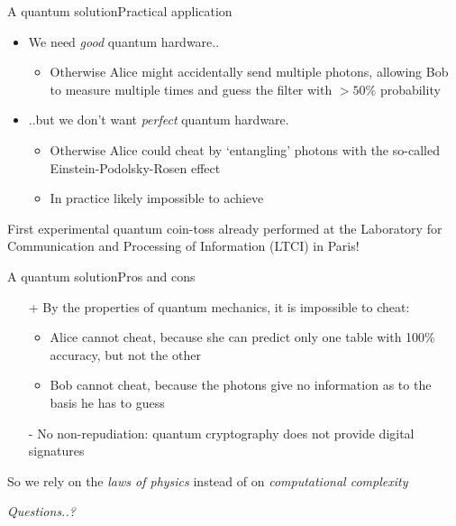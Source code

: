 \documentclass{beamer}
\begin{document}
\begin{frame}{A quantum solution}{Practical application}
\begin{itemize}
    \item We need \emph{good} quantum hardware..
        \begin{itemize}
            \item Otherwise Alice might accidentally send multiple photons, allowing Bob to measure multiple times and guess the filter with $>50\%$ probability
        \end{itemize}
    \item ..but we don't want \emph{perfect} quantum hardware.
        \begin{itemize}
            \item Otherwise Alice could cheat by `entangling' photons with the so-called Einstein-Podolsky-Rosen effect
            \item In practice likely impossible to achieve
        \end{itemize}
\end{itemize}
First experimental quantum coin-toss already performed at the Laboratory for Communication and Processing of Information (LTCI) in Paris!
\end{frame}

\begin{frame}{A quantum solution}{Pros and cons}
    \begin{itemize}
        \item[+] By the properties of quantum mechanics, it is impossible to cheat:
        \begin{itemize}
            \item Alice cannot cheat, because she can predict only one table with 100\% accuracy, but not the other
            \item Bob cannot cheat, because the photons give no information as to the basis he has to guess
        \end{itemize}
        \item[-] No non-repudiation: quantum cryptography does not provide digital signatures
    \end{itemize}

    So we rely on the \emph{laws of physics} instead of on \emph{computational complexity}
\end{frame}

\begin{frame}[plain,c]

\begin{center}
    \Huge \emph{Questions..?}
\end{center}

\end{frame}
\end{document}
